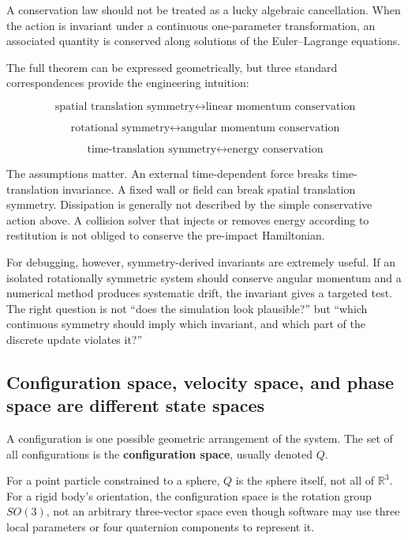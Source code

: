 A conservation law should not be treated as a lucky algebraic cancellation. When the action is invariant under a continuous one-parameter transformation, an associated quantity is conserved along solutions of the Euler--Lagrange equations.

The full theorem can be expressed geometrically, but three standard correspondences provide the engineering intuition:

\[
\boxed{
\text{spatial translation symmetry}
\longleftrightarrow
\text{linear momentum conservation}
}
\]

\[
\boxed{
\text{rotational symmetry}
\longleftrightarrow
\text{angular momentum conservation}
}
\]

\[
\boxed{
\text{time-translation symmetry}
\longleftrightarrow
\text{energy conservation}
}
\]

The assumptions matter. An external time-dependent force breaks time-translation invariance. A fixed wall or field can break spatial translation symmetry. Dissipation is generally not described by the simple conservative action above. A collision solver that injects or removes energy according to restitution is not obliged to conserve the pre-impact Hamiltonian.

For debugging, however, symmetry-derived invariants are extremely useful. If an isolated rotationally symmetric system should conserve angular momentum and a numerical method produces systematic drift, the invariant gives a targeted test. The right question is not ``does the simulation look plausible?'' but ``which continuous symmetry should imply which invariant, and which part of the discrete update violates it?''

\subsection{Configuration space, velocity space, and phase space are different state spaces}\label{02-foundations-ii-ch025-configuration-space-velocity-space-and-phase-space-are-different-state-spaces}

A configuration is one possible geometric arrangement of the system. The set of all configurations is the \textbf{configuration space}, usually denoted \(Q\).

For a point particle constrained to a sphere, \(Q\) is the sphere itself, not all of \(\mathbb R^3\). For a rigid body's orientation, the configuration space is the rotation group \(SO(3)\), not an arbitrary three-vector space even though software may use three local parameters or four quaternion components to represent it.

